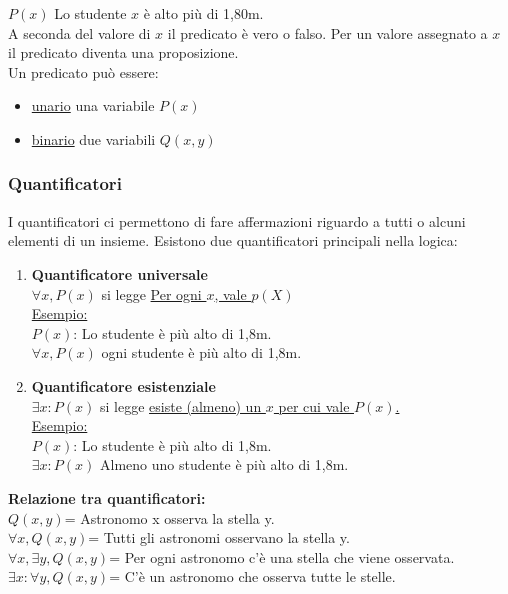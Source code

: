         \vspace{1em} 
        
        $P(x)$ Lo studente $x$ è alto più di 1,80m.    \\
        A seconda del valore di $x$ il predicato è vero o falso. Per un valore assegnato a $x$ il predicato diventa una proposizione.   \\

        Un predicato può essere: \\
        \begin{itemize}
            \item \underline{unario} una variabile $P(x)$
            \item \underline{binario} due variabili $Q(x,y)$
        \end{itemize}

    \subsubsection{Quantificatori}
    I quantificatori ci permettono di fare affermazioni riguardo a tutti o alcuni elementi di un insieme. Esistono due quantificatori principali nella logica:

    \begin{enumerate}
        \item \textbf{Quantificatore universale}    \\
        \vspace{1em} 
        $\forall x,P(x)$ si legge \underline{Per ogni $x$, vale $p(X)$} \\
        \underline{Esempio:}    \\
        $P(x)$: Lo studente è più alto di 1,8m. \\
        \(\forall x,P(x)\) ogni studente è più alto di 1,8m.
            
        \item \textbf{Quantificatore esistenziale}  \\
        \vspace{1em} 
        $\exists x:P(x)$ si legge \underline{esiste (almeno) un $x$ per cui vale $P(x)$.}   \\ 
        \underline{Esempio:}    \\
        $P(x)$: Lo studente è più alto di 1,8m. \\
        $\exists x:P(x)$ Almeno uno studente è più alto di 1,8m.
    \end{enumerate}

    \textbf{Relazione tra quantificatori:}  \\
    \vspace{0,5em}
    $Q(x,y)$= Astronomo x osserva la stella y.  \\
    $\forall x,Q(x,y)$= Tutti gli astronomi osservano la stella y.  \\
    $\forall x,\exists y,Q(x,y)$= Per ogni astronomo c'è una stella che viene osservata.    \\
    $\exists x: \forall y,Q(x,y)$= C'è un astronomo che osserva tutte le stelle.    \\

